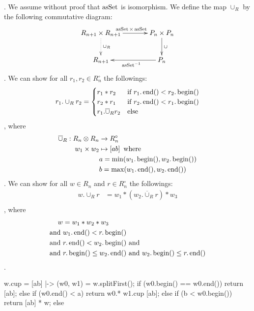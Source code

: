 . We assume without proof that $\operatorname{asSet}$ is isomorphism.
We define the map $\cup_R$ by the following commutative diagram:
\begin{equation}\begin{split}
	\xymatrix @C+12pt {
		R_{n+1}\times R_{n+1} \ar@{.>}[d]^{\cup_R}
			\ar[r]^{\myop{asSet}\times\myop{asSet}} 
			& P_n\times P_n \ar[d]^{\cup} \\
		R_{n+1} & P_n \ar[l]^{\myop{asSet}^{-1}} \\
	}
\end{split}\end{equation}
. We can show for all $r_1,r_2\in R_n^\circ$ the followings:
\begin{equation}\begin{split}
	r_1.\cup_Rr_2 &= \begin{cases}	
		r_1*r_2 &\text{if } r_1.\operatorname{end}() < r_2.\operatorname{begin}() \\
		r_2*r_1 &\text{if }r_2.\operatorname{end}() < r_1.\operatorname{begin}() \\
		r_1.\overline{\cup}_Rr_2 &\text{else} \\
	\end{cases} \\
\end{split}\end{equation}
, where
\begin{equation}\begin{split}
	\overline{\cup}_R: R_n \otimes R_n &\to R_n^\circ \\
		w_1 \times w_2 &\mapsto \left[{ab}\right] \text{ where} \\
	& a = \min(w_1.\operatorname{begin}(),w_2.\operatorname{begin}()) \\
	& b = \max(w_1.\operatorname{end}(),w_2.\operatorname{end}()) \\
\end{split}\end{equation}
. We can show for all $w\in R_n$ and $r\in R_n^\circ$ the followings:
\begin{equation}\begin{split}
	w.\cup_R r &= w_1 * (w_2.\overline{\cup}_R r) * w_3 \\
\end{split}\end{equation}
, where 
\begin{equation}\begin{split}
	w &= w_1 * w_2 * w_3 \\
	\text{and } & w_1.\operatorname{end}() < r.\operatorname{begin}() \\
	\text{and } & r.\operatorname{end}() < w_2.\operatorname{begin}() \text{ and} \\
	\text{and } & r.\operatorname{begin}() \le w_2.\operatorname{end}() 
	\text{ and } w_2.\operatorname{begin}() \le r.\operatorname{end}() \\
\end{split}\end{equation}
.
\begin{cprog}
w.cup = { [ab] |->
	(w0, w1) = w.splitFirst();
	if (w0.begin() == w0.end()) {
		return [ab];
	} else if (w0.end() < a) {
		return w0.* w1.cup [ab];
	} else if (b < w0.begin()) {
		return [ab] * w;
	} else {
	}
}
\end{cprog}

